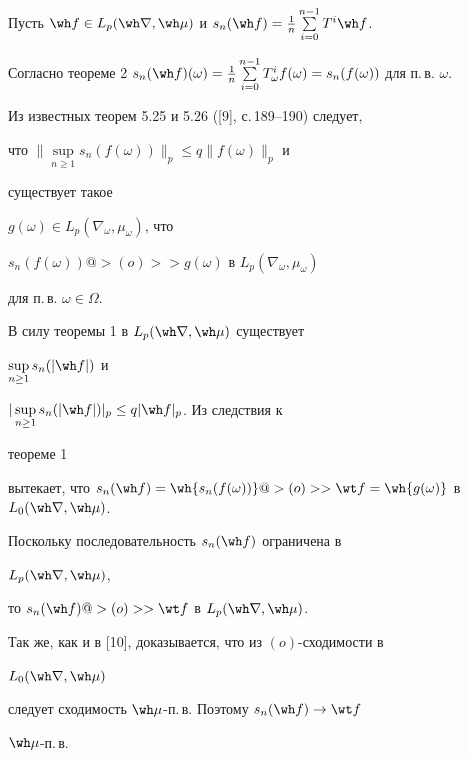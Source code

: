 \begin{pf} 


Пусть $\wh f\in L_p(\wh\nabla,\wh\mu)$ и $s_n(\wh 


f)=\frac{1}{n}\sum\limits^{n-1}_{i=0}T^i\wh f$. 


Согласно теореме 2\; $s_n(\wh 


f)(\omega)=\frac{1}{n}\sum\limits^{n-1}_{i=0} T^i_\omega 


f(\omega)=s_n(f(\omega))$ для п.\,в. $\omega$. 


Из известных теорем 5.25 и 5.26 ([9], с.\,189--190) следует, 


что $\|\sup\limits_{n\ge1}s_n(f(\omega))\|_p\le q\|f(\omega)\|_p$ и 


существует такое 


$g(\omega)\in L_p(\nabla_\omega,\mu_\omega)$, что 


$s_n(f(\omega))@>(o)>>g(\omega)$ в $L_p(\nabla_\omega,\mu_\omega)$ 


для п.\,в. $\omega\in\Omega$. 


 


В силу теоремы 1 в $L_p(\wh\nabla,\wh\mu)$ существует 


$\sup\limits_{n\ge1}s_n(|\wh f|)$ и 


$|\sup\limits_{n\ge1}s_n(|\wh f|)|_p\le q|\wh f|_p$. Из следствия к 


теореме 1 


вытекает, что $s_n(\wh f)=\wh{s_n(f(\omega))}@>(o)>>\wt 


f=\wh{g(\omega)}$ в $L_0(\wh\nabla,\wh\mu)$. 


Поскольку последовательность $s_n(\wh f)$ ограничена в 


$L_p(\wh\nabla,\wh\mu)$, 


то $s_n(\wh f)@>(o)>>\wt f$ в $L_p(\wh\nabla,\wh\mu)$. 


Так же, как и в [10], доказывается, что из $(o)$-сходимости в 


$L_0(\wh\nabla,\wh\mu)$ 


следует сходимость $\wh\mu$-п.\,в. Поэтому $s_n(\wh f)\to\wt f$\; 


$\wh\mu$-п.\,в. 


\end{pf} 


 


